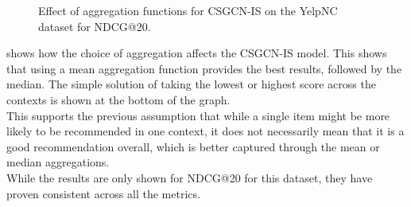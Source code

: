 \begin{figure}
    \caption{Effect of aggregation functions for CSGCN-IS on the YelpNC dataset for NDCG@20.}
    \label{fig:aggregation_effect}
\end{figure}
 shows how the choice of aggregation affects the CSGCN-IS model.
This shows that using a mean aggregation function provides the best results, followed by the median.
The simple solution of taking the lowest or highest score across the contexts is shown at the bottom of the graph.\\
This supports the previous assumption that while a single item might be more likely to be recommended in one context, it does not necessarily mean that it is a good recommendation overall, which is better captured through the mean or median aggregations.\\
While the results are only shown for NDCG@20 for this dataset, they have proven consistent across all the metrics.


